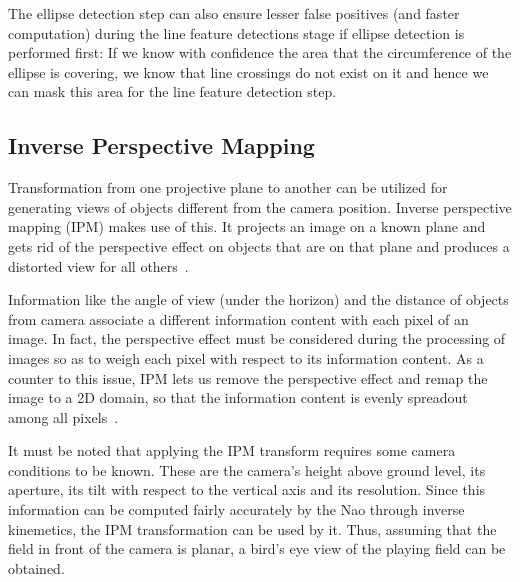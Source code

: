 \documentclass[	DIV=calc,%
							paper=a4,%
							fontsize=9pt,%
							twocolumn]{scrartcl}	 					%
\begin{document}
The ellipse detection step can also ensure lesser false positives (and faster computation) during the line feature detections stage if ellipse detection is performed first: If we know with confidence the area that the circumference of the ellipse is covering, we know that line crossings do not exist on it and hence we can mask this area for the line feature detection step.

\subsection{Inverse Perspective Mapping}
Transformation from one projective plane to another can be utilized for generating views of objects different from the camera position. Inverse perspective mapping (IPM) makes use of this. It projects an image on a known plane and gets rid of the perspective effect on objects that are on that plane and produces a distorted view for all others~\cite{IPM2}.

Information like the angle of view (under the horizon) and the distance of objects from camera associate a different information content with each pixel of an image. In fact, the perspective effect must be considered during the processing of images so as to weigh each pixel with respect to its information content. As a counter to this issue, IPM lets us remove the perspective effect and remap the image to a 2D domain, so that the information content is evenly spreadout among all pixels~\cite{IPMWeb}. 

It must be noted that applying the IPM transform requires some camera conditions to be known. These are the camera's height above ground level, its aperture, its tilt with respect to the vertical axis and its resolution. Since this information can be %
computed fairly accurately by the Nao through inverse kinemetics, the IPM transformation can be used by it. Thus, assuming that the field in front of the camera is planar, a bird's eye view of the playing field can be obtained.
\end{document}
